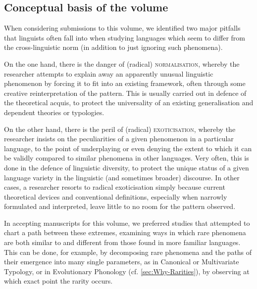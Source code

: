 \documentclass[output=paper]{langscibook}
\begin{document}
\subsection{Conceptual basis of the volume}
\label{sec:Concept-Volume}
When considering submissions to this volume, we identified two major pitfalls that linguists often fall into when studying languages which seem to differ from the cross-linguistic norm (in addition to just ignoring such phenomena).

On the one hand, there is the danger of (radical) \textsc{normalisation}, whereby the researcher attempts to explain away an apparently unusual linguistic phenomenon by forcing it to fit into an existing framework, often through some creative reinterpretation of the pattern. This is usually carried out in defence of the theoretical acquis, to protect the universality of an existing generalisation and dependent theories or typologies.

On the other hand, there is the peril of (radical) \textsc{exoticisation}, whereby the researcher insists on the peculiarities of a given phenomenon in a particular language, to the point of underplaying or even denying the extent to which it can be validly compared to similar phenomena in other languages. Very often, this is done in the defence of linguistic diversity, to protect the unique status of a given language variety in the linguistic (and sometimes broader) discourse. In other cases, a researcher resorts to radical exoticisation simply because current theoretical devices and conventional definitions, especially when narrowly formulated and interpreted, leave little to no room for the pattern observed. 

In accepting manuscripts for this volume, we preferred studies that attempted to chart a path between these extremes, examining ways in which rare phenomena are both similar to and different from those found in more familiar languages. This can be done, for example, by decomposing rare phenomena and the paths of their emergence into many single parameters, as in Canonical or Multivariate Typology, or in Evolutionary Phonology (cf. \cref{sec:Why-Rarities}), by observing at which exact point the rarity occurs.
\end{document}
